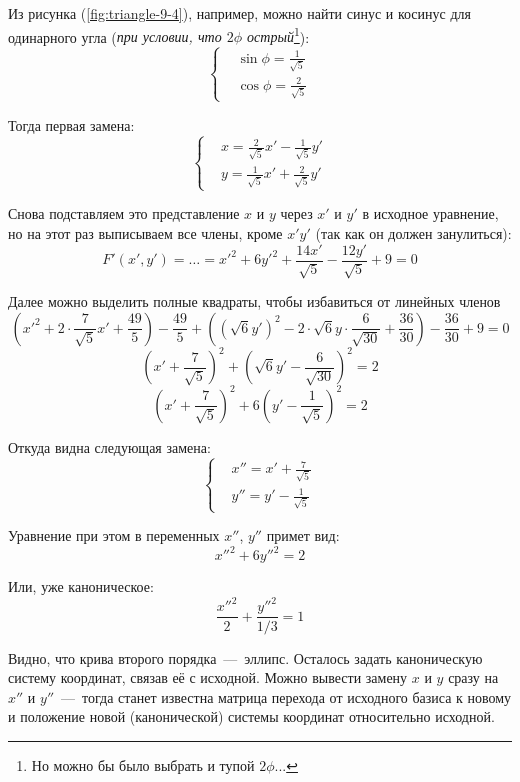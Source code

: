 \documentclass[a4paper,12pt]{article}
\begin{document}
\begin{solution}
    Из рисунка (\ref{fig:triangle-9-4}), например, можно найти синус и косинус для одинарного угла (\emph{при условии, что $2\phi$ острый}\footnote{Но можно бы было выбрать и тупой $2\phi$...}):
    \[
      \left\{
        \begin{aligned}
          &\sin\phi = \frac{1}{\sqrt{5}}\\
          &\cos\phi = \frac{2}{\sqrt{5}}
        \end{aligned}
      \right.
    \]
    
    Тогда первая замена:
    \[
      \boxed{
        \left\{
          \begin{aligned}
            &x = \frac{2}{\sqrt{5}} x' - \frac{1}{\sqrt{5}} y'\\
            &y = \frac{1}{\sqrt{5}} x' + \frac{2}{\sqrt{5}} y'
          \end{aligned}
        \right.
      }
    \]
    
    Снова подставляем это представление $x$ и $y$ через $x'$ и $y'$ в исходное уравнение, но на этот раз выписываем все члены, кроме $x'y'$ (так как он должен занулиться):
    \[
      F'(x', y') = \ldots = x'^2 + 6y'^2 + \frac{14x'}{\sqrt{5}} - \frac{12y'}{\sqrt{5}} + 9 = 0
    \]
    
    Далее можно выделить полные квадраты, чтобы избавиться от линейных членов
    \[
      \left(x'^2 + 2 \cdot \frac{7}{\sqrt{5}} x' + \frac{49}{5}\right) - \frac{49}{5}
        + \left(\left(\sqrt{6} y'\right)^2 - 2 \cdot \sqrt{6} y \cdot \frac{6}{\sqrt{30}} + \frac{36}{30}\right) - \frac{36}{30} + 9 = 0
    \]
    \[
      \left(x' + \frac{7}{\sqrt{5}}\right)^2 + \left(\sqrt{6} y' - \frac{6}{\sqrt{30}}\right)^2  = 2
    \]
    \[
      \left(x' + \frac{7}{\sqrt{5}}\right)^2 + 6\left(y' - \frac{1}{\sqrt{5}}\right)^2  = 2
    \]
    
    Откуда видна следующая замена:
    \[
      \boxed{
        \left\{
          \begin{aligned}
            &x'' = x' + \frac{7}{\sqrt{5}}\\
            &y'' = y' - \frac{1}{\sqrt{5}}
          \end{aligned}
        \right.
      }
    \]
    
    Уравнение при этом в переменных $x''$, $y''$ примет вид:
    \[
      x''^2 + 6y''^2 = 2
    \]
    
    Или, уже каноническое:
    \[
      \frac{x''^2}{2} + \frac{y''^2}{1/3} = 1
    \]
    
    Видно, что крива второго порядка~---~эллипс.
    Осталось задать каноническую систему координат, связав её с исходной.
    Можно вывести замену $x$ и $y$ сразу на $x''$ и $y''$~---~тогда станет известна матрица перехода от исходного базиса к новому и положение новой (канонической) системы координат относительно исходной.
    

\end{solution}
\end{document}
